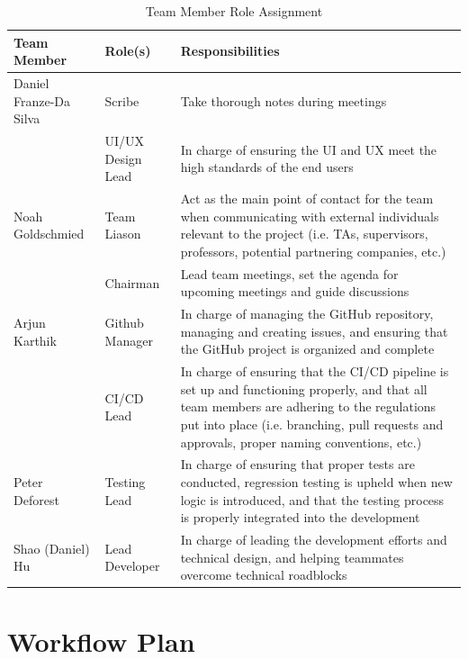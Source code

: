 \documentclass{article}
\begin{document}
\begin{table}[H]
\caption{Team Member Role Assignment} \label{TblTeamMemberRoleAssignment}
\begin{tabularx}{\textwidth}{llX}
\toprule
\textbf{Team Member} & \textbf{Role(s)} & \textbf{Responsibilities}\\
\midrule
Daniel Franze-Da Silva & Scribe & Take thorough notes during meetings\\
 & UI/UX Design Lead & In charge of ensuring the UI and UX meet the high standards of the end users\\
Noah Goldschmied & Team Liason & Act as the main point of contact for the team when communicating with external individuals relevant to the project (i.e. TAs, supervisors, professors, potential partnering companies, etc.)\\
 & Chairman & Lead team meetings, set the agenda for upcoming meetings and guide discussions\\
Arjun Karthik & Github Manager & In charge of managing the GitHub repository, managing and creating issues, and ensuring that the GitHub project is organized and complete\\
 & CI/CD Lead & In charge of ensuring that the CI/CD pipeline is set up and functioning properly, and that all team members are adhering to the regulations put into place (i.e. branching, pull requests and approvals, proper naming conventions, etc.)\\
Peter Deforest & Testing Lead & In charge of ensuring that proper tests are conducted, regression testing is upheld when new logic is introduced, and that the testing process is properly integrated into the development\\
Shao (Daniel) Hu & Lead Developer & In charge of leading the development efforts and technical design, and helping teammates overcome technical roadblocks\\
\bottomrule
\end{tabularx}
\end{table}


\section{Workflow Plan}
\end{document}
